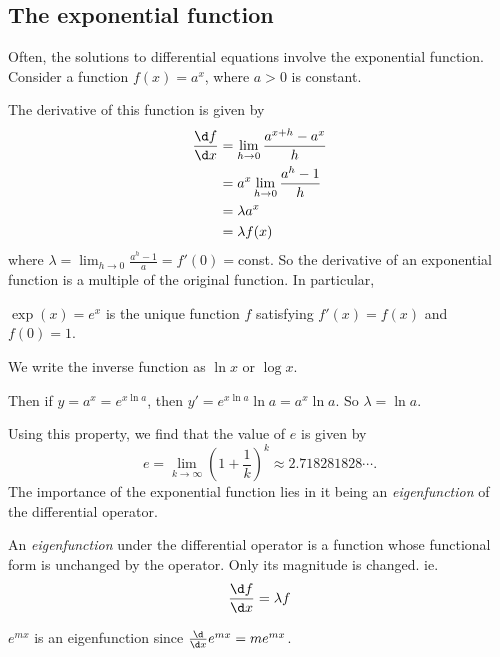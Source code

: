 \documentclass[a4paper]{article}
\begin{document}
\subsection{The exponential function}
Often, the solutions to differential equations involve the exponential function. Consider a function $f(x) = a^x$, where $a>0$ is constant.
\begin{center}
\end{center}
The derivative of this function is given by
\begin{align*}
  \frac{\d f}{\d x} &= \lim_{h\to 0}\frac{a^{x+h}-a^x}{h}\\
  &= a^x\lim_{h\to 0}\frac{a^h-1}{h}\\
  &= \lambda a^x\\
  &= \lambda f(x)
\end{align*}
where $\displaystyle \lambda = \lim_{h\to 0}\frac{a^h-1}{a} = f'(0) = $const. So the derivative of an exponential function is a multiple of the original function. In particular,

\begin{defi}
  $\exp(x) = e^x$ is the unique function $f$ satisfying $f'(x) = f(x)$ and $f(0) = 1$.

  We write the inverse function as $\ln x$ or $\log x$.
\end{defi}
Then if $y = a^x = e^{x\ln a}$, then $y' = e^{x\ln a}\ln a = a^x\ln a$. So $\lambda = \ln a$.

Using this property, we find that the value of $e$ is given by
\[
  e=\lim_{k\to \infty} \left(1 + \frac{1}{k}\right)^k \approx 2.718281828\cdots.
\]
The importance of the exponential function lies in it being an \emph{eigenfunction} of the differential operator.
\begin{defi}[Eigenfunction]
  An \emph{eigenfunction} under the differential operator is a function whose functional form is unchanged by the operator. Only its magnitude is changed. ie.
  \[
    \frac{\d f}{\d x} = \lambda f
  \]
\end{defi}
\begin{eg}
  $e^{mx}$ is an eigenfunction since $\frac{\d }{\d x}e^{mx} = me^{mx}$.
\end{eg}
\end{document}
